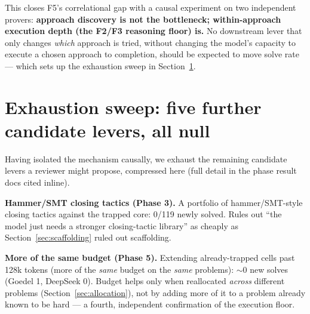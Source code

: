\documentclass{article}
\begin{document}
This closes F5's correlational gap with a causal experiment on two independent provers:
\textbf{approach discovery is not the bottleneck; within-approach execution depth (the F2/F3 reasoning
floor) is.} No downstream lever that only changes \emph{which} approach is tried, without changing the
model's capacity to execute a chosen approach to completion, should be expected to move solve rate ---
which sets up the exhaustion sweep in Section~\ref{sec:exhaustion}.

\section{Exhaustion sweep: five further candidate levers, all null}
\label{sec:exhaustion}

Having isolated the mechanism causally, we exhaust the remaining candidate levers a reviewer might
propose, compressed here (full detail in the phase result docs cited inline).

\textbf{Hammer/SMT closing tactics (Phase 3).} A portfolio of hammer/SMT-style closing tactics against
the trapped core: 0/119 newly solved. Rules out ``the model just needs a stronger closing-tactic
library'' as cheaply as Section~\ref{sec:scaffolding} ruled out scaffolding.

\textbf{More of the same budget (Phase 5).} Extending already-trapped cells past 128k tokens (more of
the \emph{same} budget on the \emph{same} problems): $\sim$0 new solves (Goedel 1, DeepSeek 0). Budget
helps only when reallocated \emph{across} different problems (Section~\ref{sec:allocation}), not by
adding more of it to a problem already known to be hard --- a fourth, independent confirmation of the
execution floor.
\end{document}
